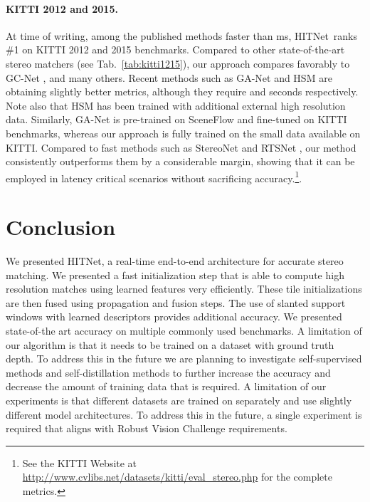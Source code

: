 \documentclass[final]{cvpr}
\newcommand{\algoname}{HITNet}
\begin{document}
\paragraph{KITTI 2012 and 2015.} At time of writing, among the published methods faster than ms, \algoname \ ranks {\#1} on KITTI 2012 and 2015 benchmarks. Compared to other state-of-the-art stereo matchers (see Tab.~\ref{tab:kitti1215}), our approach compares favorably to GC-Net \cite{kendall2017end}, \cite{pang2017cascade} and many others. Recent methods such as GA-Net \cite{Zhang2019GANet} and HSM  \cite{yang2019hierarchical} are obtaining slightly better metrics, although they require  and  seconds respectively. Note also that HSM  \cite{yang2019hierarchical} has been trained with additional external high resolution data. Similarly, GA-Net \cite{Zhang2019GANet} is pre-trained on SceneFlow and fine-tuned on KITTI benchmarks, whereas our approach is fully trained on the small data available on KITTI. Compared to fast methods such as StereoNet \cite{stereonet} and RTSNet \cite{lee19}, our method consistently outperforms them by a considerable margin, showing that it can be employed in latency critical scenarios without sacrificing accuracy.\footnote{See the KITTI Website at \href{http://www.cvlibs.net/datasets/kitti/eval_stereo.php}{http://www.cvlibs.net/datasets/kitti/eval\_stereo.php} for the complete metrics.}.
 \section{Conclusion}
We presented \algoname, a real-time end-to-end architecture for accurate stereo matching. We presented a fast initialization step that is able to compute high resolution matches using learned features very efficiently. These tile initializations are then fused using propagation and fusion steps. The use of slanted support windows with learned descriptors provides additional accuracy.
We presented state-of-the art accuracy on multiple commonly used benchmarks.
A limitation of our algorithm is that it needs to be trained on a dataset with ground truth depth. To address this in the future we are planning to investigate self-supervised methods and self-distillation methods to further increase the accuracy and decrease the amount of training data that is required. A limitation of our experiments is that different datasets are trained on separately and use slightly different model architectures. To address this in the future, a single experiment is required that aligns with Robust Vision Challenge requirements.
\end{document}
